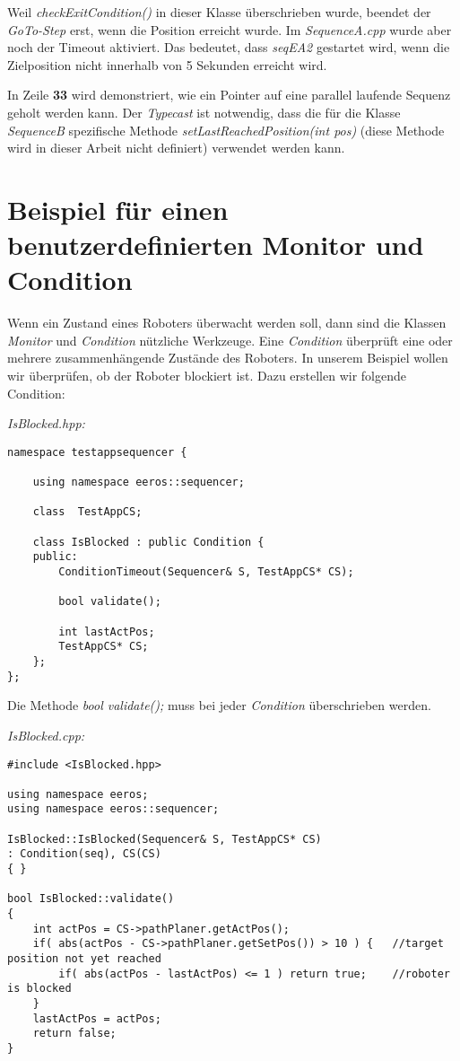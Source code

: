 Weil \textit{checkExitCondition()} in dieser Klasse überschrieben wurde, beendet der \textit{GoTo-Step} erst, wenn die Position erreicht wurde.
Im \textit{SequenceA.cpp} wurde aber noch der Timeout aktiviert.
Das bedeutet, dass \textit{seqEA2} gestartet wird, wenn die Zielposition nicht innerhalb von 5 Sekunden erreicht wird.

In Zeile \textbf{33} wird demonstriert, wie ein Pointer auf eine parallel laufende Sequenz geholt werden kann.
Der \textit{Typecast} ist notwendig, dass die für die Klasse \textit{SequenceB} spezifische Methode \textit{setLastReachedPosition(int pos)} (diese Methode wird in dieser Arbeit nicht definiert) verwendet werden kann.



\section{Beispiel für einen benutzerdefinierten Monitor und Condition}
\label{monitorUndCondition}
Wenn ein Zustand eines Roboters überwacht werden soll, dann sind die Klassen \textit{Monitor} und \textit{Condition} nützliche Werkzeuge.
Eine \textit{Condition} überprüft eine oder mehrere zusammenhängende Zustände des Roboters.
In unserem Beispiel wollen wir überprüfen, ob der Roboter blockiert ist.
Dazu erstellen wir folgende Condition:

\textit{IsBlocked.hpp:}\
\begin{lstlisting}
namespace testappsequencer {
	
	using namespace eeros::sequencer;
	
	class  TestAppCS;
	
	class IsBlocked : public Condition {
	public:
		ConditionTimeout(Sequencer& S, TestAppCS* CS);
		
		bool validate();
		
		int lastActPos;
		TestAppCS* CS;
	};
};		
\end{lstlisting}

Die Methode \textit{bool validate();} muss bei jeder \textit{Condition} überschrieben werden.


\textit{IsBlocked.cpp:}\
\begin{lstlisting}
#include <IsBlocked.hpp>

using namespace eeros;
using namespace eeros::sequencer;

IsBlocked::IsBlocked(Sequencer& S, TestAppCS* CS)
: Condition(seq), CS(CS)
{ }

bool IsBlocked::validate()
{
	int actPos = CS->pathPlaner.getActPos();
	if( abs(actPos - CS->pathPlaner.getSetPos()) > 10 ) {	//target position not yet reached
		if( abs(actPos - lastActPos) <= 1 ) return true;	//roboter is blocked
	}
	lastActPos = actPos;	
	return false;
}
\end{lstlisting}

